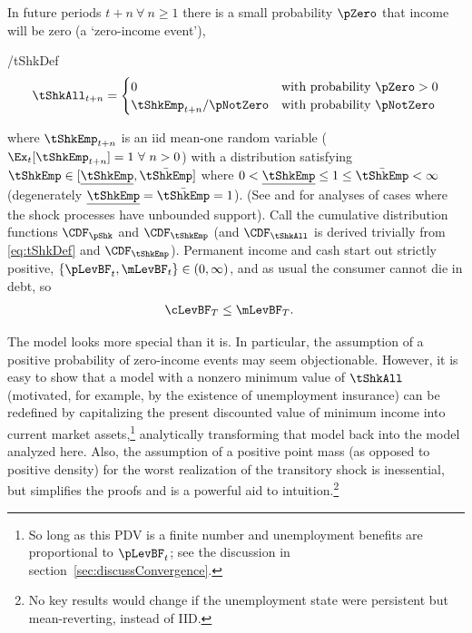 \documentclass[BufferStockTheory]{subfiles}
\begin{document}
In future periods $t+n ~\forall~ n \geq 1$ there is a small probability $\pZero$ that income will
be zero (a `zero-income event'),
\begin{verbatimwrite}{\EqDir/tShkDef}
  \begin{equation}
    \tShkAll _{t+n}=
    \begin{cases}
      0\phantom{_{t+1}/\pNotZero} & \text{with probability $\pZero>0$} \\
      \tShkEmp_{t+n}/\pNotZero      & \text{with probability $\pNotZero  $} %
    \end{cases} \label{eq:tShkDef}
  \end{equation}
\end{verbatimwrite}

where $\tShkEmp_{t+n}$ is an iid mean-one random variable
($\Ex_{t}[{\tShkEmp}_{t+n}]=1~\forall~n>0$)
with a distribution
satisfying $\tShkEmp \in \lbrack \ushort{\tShkEmp},\bar{\tShkEmp}\rbrack$
where $0<\ushort{\tShkEmp} \leq 1 \leq \bar{\tShkEmp}<\infty$
(degenerately $\ushort{\tShkEmp}=\bar{\tShkEmp}=1$). (See \cite{rabaultBorrowing} and \cite{lsIncFluct} for analyses of cases where the shock processes have unbounded support).  Call the cumulative
distribution functions $\CDF_{\pShk}$ and $\CDF_{\tShkEmp}$ (and $\CDF_{\tShkAll}$
is derived trivially from \eqref{eq:tShkDef} and $\CDF_{\tShkEmp}$).
Permanent income and cash start out strictly positive, $\{\pLevBF_{t},\mLevBF_{t}\} \in
(0,\infty)$, and as usual the consumer cannot die in
debt, so
\begin{align}
  \cLevBF_{T} & \leq  \mLevBF_{T} \label{eq:NoDebtAtDeath}.
\end{align}

\hypertarget{PDV}{}
The model looks more special than it is.  In particular, the
assumption of a positive probability of zero-income events may seem
objectionable.  However, it is easy to show that a model with a
nonzero minimum value of $\tShkAll$ (motivated, for example, by the
existence of unemployment insurance) can be redefined by capitalizing
the present discounted value of minimum income into current market assets,\footnote{So long
  as this PDV is a finite number and unemployment benefits are
  proportional to $\pLevBF_{t}$; see the discussion in
  section~\ref{sec:discussConvergence}.}  analytically transforming
that model back into the model analyzed here.  Also, the assumption of
a positive point mass (as opposed to positive density) for the worst
realization of the transitory shock is inessential, but simplifies the proofs and is a powerful aid to intuition.\footnote{No key results would change if the unemployment state were persistent but mean-reverting, instead of IID.}
\end{document}
